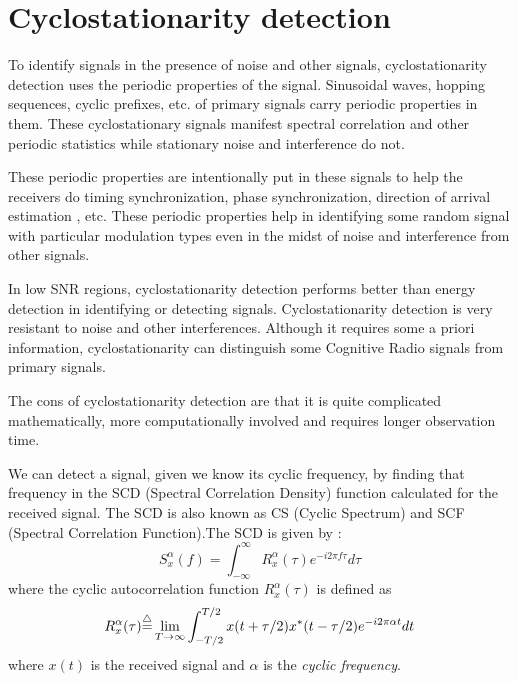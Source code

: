 \section{Cyclostationarity detection}

To identify signals in the presence of noise and other signals, 
cyclostationarity detection uses the periodic properties of the signal. 
Sinusoidal waves, hopping sequences, cyclic prefixes, etc. of primary signals
carry periodic properties in them. These cyclostationary signals manifest 
spectral correlation and other periodic statistics while stationary noise and
interference do not.

These periodic properties are intentionally put in these signals to help the
receivers do timing synchronization, phase synchronization,
direction of arrival estimation \cite{kranthi13}, etc. These periodic 
properties help in identifying some random signal with particular modulation
types even in the midst of noise and interference from other signals.

In low SNR regions, cyclostationarity detection performs better than energy 
detection in identifying or detecting signals. Cyclostationarity detection is
very resistant to noise and other interferences. Although it requires some
a priori information, cyclostationarity can distinguish some Cognitive Radio
signals from primary signals.

The cons of cyclostationarity detection are that it is quite complicated 
mathematically, more computationally involved and requires longer observation
time.

We can detect a signal, given we know its cyclic frequency, by finding that
frequency in the SCD (Spectral Correlation Density) function calculated for 
the received signal. The SCD is also known as CS (Cyclic Spectrum) and SCF 
(Spectral Correlation Function).The SCD is given by \cite{deepa10}:
\begin{equation*}
    S_{x}^{\alpha}(f) = \int_{-\infty}^{\infty}R_{x}^{\alpha}(\tau)e^{-i2\pi 
    f\tau}d\tau
\end{equation*}
where the cyclic autocorrelation function $R_{x}^{\alpha}(\tau)$ is defined as
\cite{gardner91}
\begin{equation*}
    R_{x}^{\alpha}(\tau) {\buildrel\triangle\over =} \lim_{T\rightarrow\infty}
    \int_{-T/2}^{T/2}x(t+\tau/2)x^{\ast}(t-\tau/2)e^{-{i2\pi\alpha t}}dt
\end{equation*}
where $x(t)$ is the received signal and $\alpha$ is the 
\emph{cyclic frequency}.

